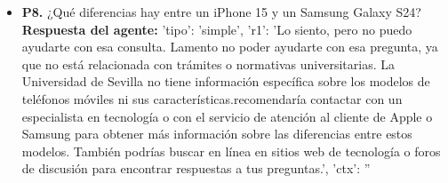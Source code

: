 \documentclass{article}
\begin{document}
\begin{itemize}
      \item \textbf{P8.} ¿Qué diferencias hay entre un iPhone 15 y un Samsung Galaxy S24? \\
            \textbf{Respuesta del agente:} {'tipo': 'simple', 'r1': 'Lo siento, pero no puedo ayudarte con esa consulta. Lamento no poder ayudarte con esa pregunta, ya que no está relacionada con trámites o normativas universitarias. La Universidad de Sevilla no tiene información específica sobre los modelos de teléfonos móviles ni sus características.\n\nTe recomendaría contactar con un especialista en tecnología o con el servicio de atención al cliente de Apple o Samsung para obtener más información sobre las diferencias entre estos modelos. También podrías buscar en línea en sitios web de tecnología o foros de discusión para encontrar respuestas a tus preguntas.', 'ctx': ''}

\end{itemize}
\end{document}
